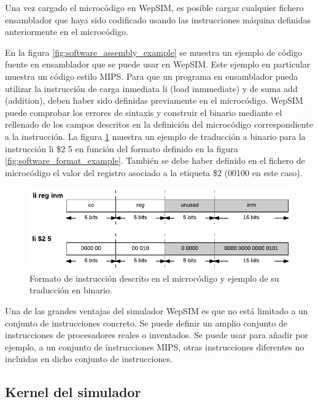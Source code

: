 Una vez cargado el microcódigo en WepSIM, es posible cargar cualquier fichero ensamblador que haya sido codificado usando las instrucciones  máquina definidas anteriormente en el microcódigo.

En la figura \ref{fig:software_assembly_example} se muestra un ejemplo de código fuente en ensamblador que se puede usar en WepSIM. Este ejemplo en particular muestra un código estilo MIPS. Para que un programa en ensamblador pueda utilizar la instrucción de carga inmediata li (load inmmediate) y de suma add (addition), deben haber sido definidas previamente en el microcódigo. WepSIM puede comprobar los errores de sintaxis y construir el binario mediante el rellenado de los campos descritos en la definición del microcódigo correspondiente a la instrucción. La figura \ref{fig:software_assembly_traduction} muestra un ejemplo de traducción a binario para la instrucción li \$2 5 en función del formato definido en la figura \ref{fig:software_format_example}. También se debe haber definido en el fichero de microcódigo el valor del registro asociado a la etiqueta \$2 (00100 en este caso).

\begin{figure}[htbp]
 	\centering
 	\includegraphics[width=14cm]{figures/instruction_example_traduction}
 	\caption{Formato de instrucción descrito en el microcódigo y ejemplo de su traducción en binario.}
	\label{fig:software_assembly_traduction}
\end{figure}

Una de las grandes ventajas del simulador WepSIM es que no está limitado a un conjunto de instrucciones concreto. Se puede definir un amplio conjunto de instrucciones de procesadores reales o inventados. Se puede usar para añadir por ejemplo, a un conjunto de instrucciones MIPS, otras instrucciones diferentes no incluidas en dicho conjunto de instrucciones.

\subsection{Kernel del simulador}
\label{sec:kernel_simulator}

